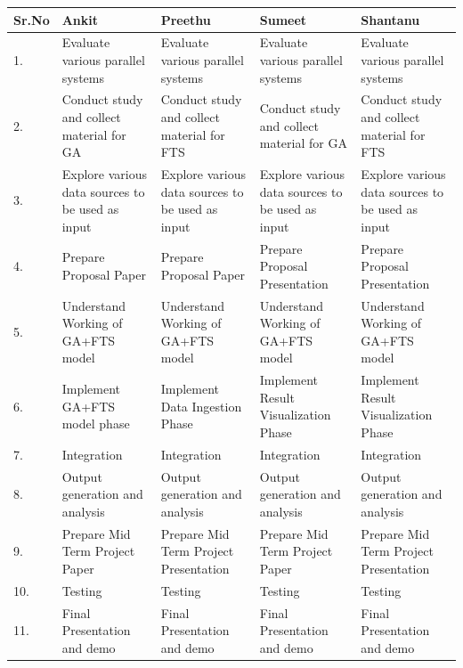 \documentclass[12pt,journal,compsoc]{IEEEtran}
\begin{document}
\begin{table}[t]

\tiny
  
  \centering

 
  

\begin{tabularx}{\textwidth}{| l | X | X | X | X |}
  \hline     
    \rowcolor{lightblue}                            
    \textbf{Sr.No} & \textbf{ Ankit} & \textbf{ Preethu} & \textbf{ Sumeet} & \textbf{ Shantanu} \\
  \hline 
      \rowcolor{lightgreen}       
  1. & Evaluate various parallel systems & Evaluate various parallel systems & Evaluate various parallel systems & Evaluate various parallel systems \\
  \hline
        \rowcolor{lightgreen}       
   2. & Conduct study and collect material for GA & Conduct study and collect material for FTS & Conduct study and collect material for GA & Conduct study and collect material for FTS \\
  \hline  
        \rowcolor{lightgreen}       
   3.  & Explore various data sources to be used as input & Explore various data sources to be used as input & Explore various
data sources to be used as input & Explore various data sources to be used as input \\
    \hline  
          \rowcolor{lightgreen}       
    4. &  Prepare Proposal Paper & Prepare Proposal Paper & Prepare Proposal Presentation & Prepare Proposal Presentation \\
      \hline  
            \rowcolor{lightgreen}       
	5. &  Understand Working of GA+FTS model & Understand Working of GA+FTS model & Understand Working of GA+FTS model & Understand Working of GA+FTS model \\
  \hline  
           \rowcolor{yellow}  
   6. & Implement GA+FTS model phase & Implement Data Ingestion Phase & Implement Result Visualization Phase & Implement Result Visualization Phase \\
   \hline  
              \rowcolor{yellow}  
   7.  & Integration & Integration & Integration & Integration \\
   \hline  
              \rowcolor{yellow}  
   8. & Output generation and analysis & Output generation and analysis & Output generation and analysis & Output generation and analysis \\
   \hline  
         \rowcolor{lightgreen}       
   9. & Prepare Mid Term Project Paper & Prepare Mid Term Project Presentation & Prepare Mid Term Project Paper & Prepare Mid Term Project Presentation \\
   \hline  
         \rowcolor{lightred}       
   10. & Testing & Testing & Testing & Testing \\
   \hline  
            \rowcolor{lightred}  
   11. & Final Presentation and demo & Final Presentation and demo & Final Presentation and demo & Final Presentation and demo \\
  \hline
\end{tabularx}


\end{table}
\end{document}
